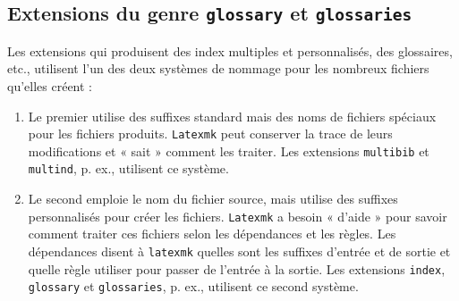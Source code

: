 \documentclass[11pt,french]{article}
\newcommand{\TS}{\textsf{\TeX Shop}}
\begin{document}
%
%


\subsection{Extensions du genre \texttt{glossary} et \texttt{glossaries}}

Les extensions qui produisent des index multiples et personnalisés, des glossaires, etc., utilisent l'un des deux systèmes de nommage pour les nombreux fichiers qu'elles créent :
\begin{enumerate}
\item 
Le premier utilise des suffixes standard mais des noms de fichiers spéciaux pour les fichiers produits. \texttt{Latexmk} peut conserver la trace de leurs modifications et « sait » comment les traiter. Les extensions \texttt{multibib} et \texttt{multind}, p. ex., utilisent ce système.
\item 
Le second emploie le nom du fichier source, mais utilise des suffixes personnalisés pour créer les fichiers. \texttt{Latexmk} a besoin « d'aide » pour savoir comment traiter ces fichiers selon les dépendances et les règles. Les dépendances disent à \texttt{latexmk} quelles sont les suffixes d'entrée et de sortie et quelle règle utiliser pour passer de l'entrée à la sortie. Les extensions \texttt{index}, \texttt{glossary} et \texttt{glossaries}, p. ex., utilisent ce second système.
\end{enumerate}
\end{document}
